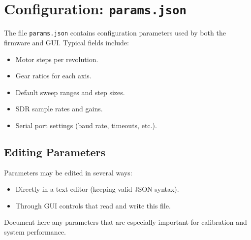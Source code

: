 \chapter{Configuration: \texttt{params.json}}

The file \texttt{params.json} contains configuration parameters used by both the firmware and GUI. Typical fields include:

\begin{itemize}
  \item Motor steps per revolution.
  \item Gear ratios for each axis.
  \item Default sweep ranges and step sizes.
  \item SDR sample rates and gains.
  \item Serial port settings (baud rate, timeouts, etc.).
\end{itemize}

\section{Editing Parameters}

Parameters may be edited in several ways:

\begin{itemize}
  \item Directly in a text editor (keeping valid JSON syntax).
  \item Through GUI controls that read and write this file.
\end{itemize}

Document here any parameters that are especially important for calibration and system performance.
